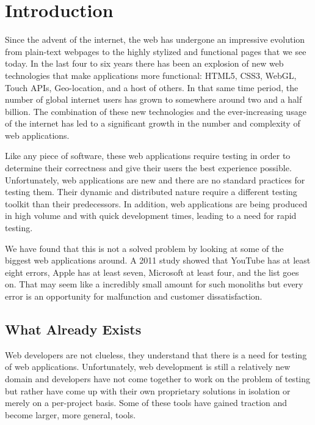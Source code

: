 \documentclass[12pt]{ucthesis}
\begin{document}
\pagestyle{plain}

\renewcommand{\baselinestretch}{1.66}

\chapter{Introduction}
Since the advent of the internet, the web has undergone an impressive evolution from plain-text webpages to the highly stylized and functional pages that we see today. In the last four to six years there has been an explosion of new web technologies that make applications more functional: HTML5, CSS3, WebGL, Touch APIs, Geo-location, and a host of others\cite{EvolutionOfWeb}. In that same time period, the number of global internet users has grown to somewhere around two and a half billion\cite{EvolutionOfWeb}. The combination of these new technologies and the ever-increasing usage of the internet has led to a significant growth in the number and complexity of web applications.

Like any piece of software, these web applications require testing in order to determine their correctness and give their users the best experience possible. Unfortunately, web applications are new and there are no standard practices for testing them. Their dynamic and distributed nature require a different testing toolkit than their predecessors. In addition, web applications are being produced in high volume and with quick development times, leading to a need for rapid testing.

We have found that this is not a solved problem by looking at some of the biggest web applications around. A 2011 study showed that YouTube has at least eight errors, Apple has at least seven, Microsoft at least four, and the list goes on\cite{ErrorsInTheWild}. That may seem like a incredibly small amount for such monoliths but every error is an opportunity for malfunction and customer dissatisfaction.

\section{What Already Exists}
Web developers are not clueless, they understand that there is a need for testing of web applications. Unfortunately, web development is still a relatively new domain and developers have not come together to work on the problem of testing but rather have come up with their own proprietary solutions in isolation or merely on a per-project basis. Some of these tools have gained traction and become larger, more general, tools.
\end{document}
